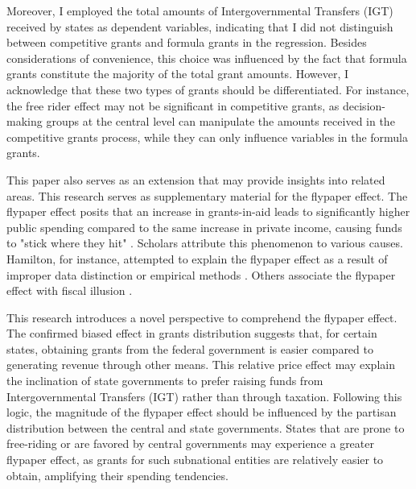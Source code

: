 \documentclass[man]{apa7}
\begin{document}
Moreover, I employed the total amounts of Intergovernmental Transfers (IGT) received by states as dependent variables, indicating that I did not distinguish between competitive grants and formula grants in the regression. Besides considerations of convenience, this choice was influenced by the fact that formula grants constitute the majority of the total grant amounts. However, I acknowledge that these two types of grants should be differentiated. For instance, the free rider effect may not be significant in competitive grants, as decision-making groups at the central level can manipulate the amounts received in the competitive grants process, while they can only influence variables in the formula grants.

This paper also serves as an extension that may provide insights into related areas. This research serves as supplementary material for the flypaper effect. The flypaper effect posits that an increase in grants-in-aid leads to significantly higher public spending compared to the same increase in private income, causing funds to "stick where they hit" \parencite{inman2008flypaper}. Scholars attribute this phenomenon to various causes. Hamilton, for instance, attempted to explain the flypaper effect as a result of improper data distinction or empirical methods \parencite{hamilton1986flypaper}. Others associate the flypaper effect with fiscal illusion \parencite{gramlich1997stimulative}.

This research introduces a novel perspective to comprehend the flypaper effect. The confirmed biased effect in grants distribution suggests that, for certain states, obtaining grants from the federal government is easier compared to generating revenue through other means. This relative price effect may explain the inclination of state governments to prefer raising funds from Intergovernmental Transfers (IGT) rather than through taxation. Following this logic, the magnitude of the flypaper effect should be influenced by the partisan distribution between the central and state governments. States that are prone to free-riding or are favored by central governments may experience a greater flypaper effect, as grants for such subnational entities are relatively easier to obtain, amplifying their spending tendencies.



\end{document}
